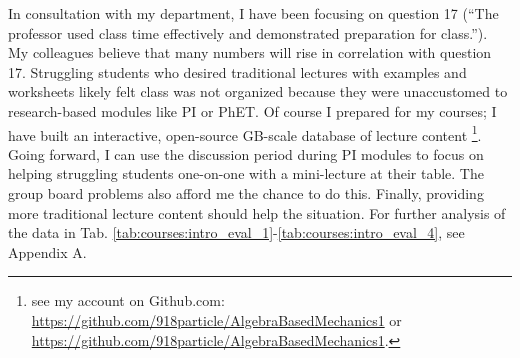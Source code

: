 \documentclass[../../main.tex]{subfiles}
\begin{document}
In consultation with my department, I have been focusing on question 17 (``The professor used class time effectively and demonstrated preparation for class.'').  My colleagues believe that many numbers will rise in correlation with question 17.  Struggling students who desired traditional lectures with examples and worksheets likely felt class was not organized because they were unaccustomed to research-based modules like PI or PhET.  Of course I prepared for my courses; I have built an interactive, open-source GB-scale database of lecture content \footnote{see my account on Github.com: \url{https://github.com/918particle/AlgebraBasedMechanics1} or \url{https://github.com/918particle/AlgebraBasedMechanics1}.}.  Going forward, I can use the discussion period during PI modules to focus on helping struggling students one-on-one with a mini-lecture at their table.  The group board problems also afford me the chance to do this.  Finally, providing more traditional lecture content should help the situation. For further analysis of the data in Tab. \ref{tab:courses:intro_eval_1}-\ref{tab:courses:intro_eval_4}, see Appendix A. \\ \hspace{0.1cm}
\end{document}

